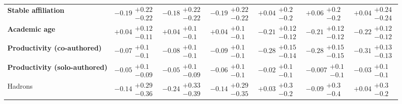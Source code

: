 \begin{table}[H]
\begin{tabular}{lllllll}
\textbf{Stable affiliation} & $-0.19\substack{+0.22 \\ -0.22}$ & $-0.18\substack{+0.22 \\ -0.22}$ & $-0.19\substack{+0.22 \\ -0.22}$ & $+0.04\substack{+0.2 \\ -0.2}$ & $+0.06\substack{+0.2 \\ -0.2}$ & $+0.04\substack{+0.24 \\ -0.24}$ \\
\textbf{Academic age} & $+0.04\substack{+0.12 \\ -0.11}$ & $+0.04\substack{+0.1 \\ -0.1}$ & $+0.04\substack{+0.1 \\ -0.1}$ & $\bm{-0.21}\substack{+0.12 \\ -0.12}$ & $\bm{-0.21}\substack{+0.12 \\ -0.12}$ & $\bm{-0.22}\substack{+0.12 \\ -0.12}$ \\
\textbf{Productivity (co-authored)} & $-0.07\substack{+0.1 \\ -0.1}$ & $-0.08\substack{+0.1 \\ -0.1}$ & $-0.09\substack{+0.1 \\ -0.1}$ & $\bm{-0.28}\substack{+0.15 \\ -0.14}$ & $\bm{-0.28}\substack{+0.15 \\ -0.15}$ & $\bm{-0.31}\substack{+0.13 \\ -0.13}$ \\
\textbf{Productivity (solo-authored)} & $-0.05\substack{+0.1 \\ -0.09}$ & $-0.05\substack{+0.1 \\ -0.09}$ & $-0.06\substack{+0.1 \\ -0.1}$ & $-0.02\substack{+0.1 \\ -0.1}$ & $-0.007\substack{+0.1 \\ -0.1}$ & $-0.03\substack{+0.1 \\ -0.1}$ \\
\hline Hadrons & $-0.14\substack{+0.29 \\ -0.36}$ & $-0.24\substack{+0.33 \\ -0.39}$ & $-0.14\substack{+0.29 \\ -0.35}$ & $+0.03\substack{+0.3 \\ -0.2}$ & $-0.09\substack{+0.3 \\ -0.4}$ & $+0.04\substack{+0.3 \\ -0.2}$ \\

\end{tabular}
\end{table}

